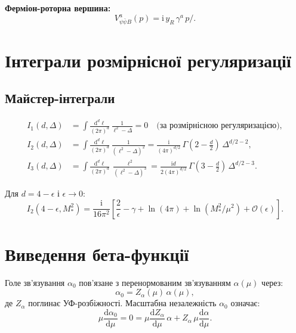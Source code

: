 \documentclass[11pt,a4paper]{article}
\numberwithin{equation}{section}
\theoremstyle{plain}
\theoremstyle{definition}
\theoremstyle{remark}
\newcommand{\dd}{\mathrm{d}}
\newcommand{\ii}{\mathrm{i}}
\begin{document}
\textbf{Ферміон-роторна вершина:}
\begin{equation}
V_{\psi\bar\psi B}^a(p) = \ii\,y_R\,\gamma^a\,p\!\!\!/.
\label{eq:V-fermion-summary}
\end{equation}

\section{Інтеграли розмірнісної регуляризації}\label{app:integrals}

\subsection{Майстер-інтеграли}

\begin{align}
I_1(d,\Delta) &= \int \frac{\dd^d \ell}{(2\pi)^d}\,\frac{1}{\ell^2-\Delta} = 0 \quad\text{(за розмірнісною регуляризацією)}, \label{eq:I1-master}\\
I_2(d,\Delta) &= \int \frac{\dd^d \ell}{(2\pi)^d}\,\frac{1}{(\ell^2-\Delta)^2} = \frac{\ii}{(4\pi)^{d/2}}\,\Gamma\left(2-\frac{d}{2}\right)\,\Delta^{d/2-2}, \label{eq:I2-master}\\
I_3(d,\Delta) &= \int \frac{\dd^d \ell}{(2\pi)^d}\,\frac{\ell^2}{(\ell^2-\Delta)^3} = \frac{\ii d}{2(4\pi)^{d/2}}\,\Gamma\left(3-\frac{d}{2}\right)\,\Delta^{d/2-3}. \label{eq:I3-master}
\end{align}

Для $d=4-\epsilon$ і $\epsilon\to 0$:
\begin{equation}
I_2(4-\epsilon,M_*^2) = \frac{\ii}{16\pi^2}\left[\frac{2}{\epsilon} - \gamma + \ln(4\pi) + \ln(M_*^2/\mu^2) + \mathcal{O}(\epsilon)\right].
\label{eq:I2-d4}
\end{equation}

\section{Виведення бета-функції}\label{app:beta}

Голе зв'язування $\alpha_0$ пов'язане з перенормованим зв'язуванням $\alpha(\mu)$ через:
\begin{equation}
\alpha_0 = Z_\alpha(\mu)\,\alpha(\mu),
\label{eq:alpha-bare}
\end{equation}
де $Z_\alpha$ поглинає УФ-розбіжності. Масштабна незалежність $\alpha_0$ означає:
\begin{equation}
\mu\frac{\dd\alpha_0}{\dd\mu} = 0 = \mu\frac{\dd Z_\alpha}{\dd\mu}\,\alpha + Z_\alpha\,\mu\frac{\dd\alpha}{\dd\mu}.
\label{eq:bare-scale-indep}
\end{equation}
\end{document}

